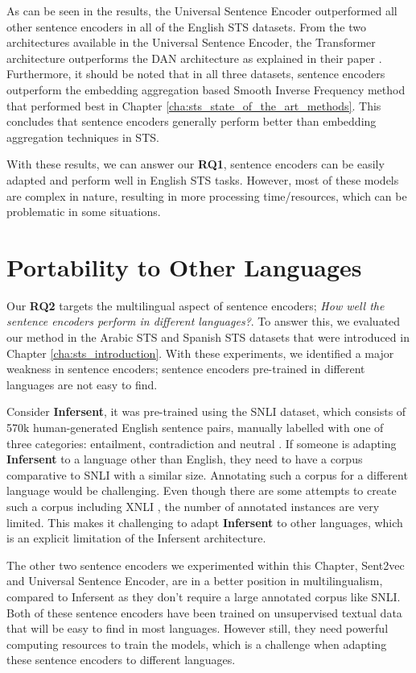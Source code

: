 As can be seen in the results, the Universal Sentence Encoder outperformed all other sentence encoders in all of the English STS datasets. From the two architectures available in the Universal Sentence Encoder, the Transformer architecture outperforms the DAN architecture as explained in their paper \autocite{cer2018universal}. Furthermore, it should be noted that in all three datasets, sentence encoders outperform the embedding aggregation based Smooth Inverse Frequency method that performed best in Chapter \ref{cha:sts_state_of_the_art_methods}. This concludes that sentence encoders generally perform better than embedding aggregation techniques in STS. 

With these results, we can answer our \textbf{RQ1}, sentence encoders can be easily adapted and perform well in English STS tasks. However, most of these models are complex in nature, resulting in more processing time/resources, which can be problematic in some situations. 


\section{Portability to Other Languages}
\label{sec:sentence_languages}
Our \textbf{RQ2} targets the multilingual aspect of sentence encoders; \textit{How well the sentence encoders perform in different languages?}. To answer this, we evaluated our method in the Arabic STS and Spanish STS datasets that were introduced in Chapter \ref{cha:sts_introduction}. With these experiments, we identified a major weakness in sentence encoders; sentence encoders pre-trained in different languages are not easy to find. 

Consider \textbf{Infersent}, it was pre-trained using the SNLI dataset, which consists of 570k human-generated English sentence pairs, manually labelled with one of three categories: entailment, contradiction and neutral \autocite{bowman-etal-2015-large}. If someone is adapting \textbf{Infersent} to a language other than English, they need to have a corpus comparative to SNLI with a similar size. Annotating such a corpus for a different language would be challenging. Even though there are some attempts to create such a corpus including XNLI \autocite{conneau-etal-2018-xnli}, the number of annotated instances are very limited. This makes it challenging to adapt \textbf{Infersent} to other languages, which is an explicit limitation of the Infersent architecture. 

The other two sentence encoders we experimented within this Chapter, Sent2vec and Universal Sentence Encoder, are in a better position in multilingualism, compared to Infersent as they don't require a large annotated corpus like SNLI. Both of these sentence encoders have been trained on unsupervised textual data that will be easy to find in most languages. However still, they need powerful computing resources to train the models, which is a challenge when adapting these sentence encoders to different languages. 

